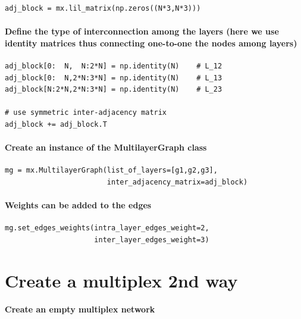 \documentclass[11pt]{article}
\begin{document}
\begin{verbatim}
adj_block = mx.lil_matrix(np.zeros((N*3,N*3)))
\end{verbatim}

\paragraph{Define the type of interconnection among the layers (here we
use identity matrices thus connecting one-to-one the nodes among
layers)}\label{define-the-type-of-interconnection-among-the-layers-here-we-use-identity-matrices-thus-connecting-one-to-one-the-nodes-among-layers}

\begin{verbatim}
adj_block[0:  N,  N:2*N] = np.identity(N)    # L_12
adj_block[0:  N,2*N:3*N] = np.identity(N)    # L_13
adj_block[N:2*N,2*N:3*N] = np.identity(N)    # L_23

# use symmetric inter-adjacency matrix
adj_block += adj_block.T
\end{verbatim}

\paragraph{Create an instance of the MultilayerGraph
class}\label{create-an-instance-of-the-multilayergraph-class}

\begin{verbatim}
mg = mx.MultilayerGraph(list_of_layers=[g1,g2,g3],
                        inter_adjacency_matrix=adj_block)
\end{verbatim}

\paragraph{Weights can be added to the
edges}\label{weights-can-be-added-to-the-edges}

\begin{verbatim}
mg.set_edges_weights(intra_layer_edges_weight=2,
                     inter_layer_edges_weight=3)
\end{verbatim}

\section{Create a multiplex 2nd way}\label{create-a-multiplex-2nd-way}

\paragraph{Create an empty multiplex
network}\label{create-an-empty-multiplex-network}
\end{document}
